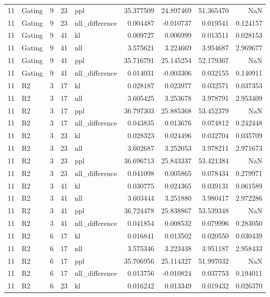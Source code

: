 \begin{tabular}{rlrrlrrrr}
11 & Gating & 9 & 23 & ppl & 35.377509 & 24.897469 & 51.365470 & NaN \\
11 & Gating & 9 & 23 & nll_difference & 0.004487 & -0.010737 & 0.019541 & 0.124157 \\
11 & Gating & 9 & 41 & kl & 0.009727 & 0.006999 & 0.013511 & 0.028153 \\
11 & Gating & 9 & 41 & nll & 3.575621 & 3.224669 & 3.954687 & 2.969677 \\
11 & Gating & 9 & 41 & ppl & 35.716791 & 25.145254 & 52.179367 & NaN \\
11 & Gating & 9 & 41 & nll_difference & 0.014031 & -0.003306 & 0.032155 & 0.140911 \\
11 & R2 & 3 & 17 & kl & 0.028187 & 0.023977 & 0.032571 & 0.037353 \\
11 & R2 & 3 & 17 & nll & 3.605425 & 3.253678 & 3.978791 & 2.953409 \\
11 & R2 & 3 & 17 & ppl & 36.797303 & 25.885368 & 53.452379 & NaN \\
11 & R2 & 3 & 17 & nll_difference & 0.043835 & 0.013676 & 0.074812 & 0.242448 \\
11 & R2 & 3 & 23 & kl & 0.028323 & 0.024496 & 0.032704 & 0.035709 \\
11 & R2 & 3 & 23 & nll & 3.602687 & 3.252053 & 3.978211 & 2.971673 \\
11 & R2 & 3 & 23 & ppl & 36.696713 & 25.843337 & 53.421384 & NaN \\
11 & R2 & 3 & 23 & nll_difference & 0.041098 & 0.005865 & 0.078434 & 0.279971 \\
11 & R2 & 3 & 41 & kl & 0.030775 & 0.024365 & 0.039131 & 0.061589 \\
11 & R2 & 3 & 41 & nll & 3.603444 & 3.251880 & 3.980417 & 2.972286 \\
11 & R2 & 3 & 41 & ppl & 36.724478 & 25.838867 & 53.539348 & NaN \\
11 & R2 & 3 & 41 & nll_difference & 0.041854 & 0.008532 & 0.079996 & 0.283050 \\
11 & R2 & 6 & 17 & kl & 0.016841 & 0.013502 & 0.020550 & 0.030439 \\
11 & R2 & 6 & 17 & nll & 3.575346 & 3.223438 & 3.951187 & 2.958433 \\
11 & R2 & 6 & 17 & ppl & 35.706956 & 25.114327 & 51.997032 & NaN \\
11 & R2 & 6 & 17 & nll_difference & 0.013756 & -0.010824 & 0.037753 & 0.194011 \\
11 & R2 & 6 & 23 & kl & 0.016242 & 0.013349 & 0.019432 & 0.026370 \\

\end{tabular}
